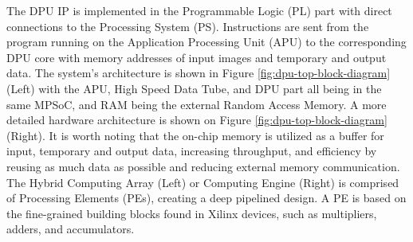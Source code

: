 The DPU IP is implemented in the Programmable Logic (PL) part with direct connections to the Processing System (PS). Instructions are sent from the program running on the Application Processing Unit (APU) to the corresponding DPU core with memory addresses of input images and temporary and output data. The system's architecture is shown in Figure \ref{fig:dpu-top-block-diagram} (Left) with the APU, High Speed Data Tube, and DPU part all being in the same MPSoC, and RAM being the external Random Access Memory. A more detailed hardware architecture is shown on Figure \ref{fig:dpu-top-block-diagram} (Right). It is worth noting that the on-chip memory is utilized as a buffer for input, temporary and output data, increasing throughput, and efficiency by reusing as much data as possible and reducing external memory communication. The Hybrid Computing Array (Left) or Computing Engine (Right) is comprised of Processing Elements (PEs), creating a deep pipelined design. A PE is based on the fine-grained building blocks found in Xilinx devices, such as multipliers, adders, and accumulators.

